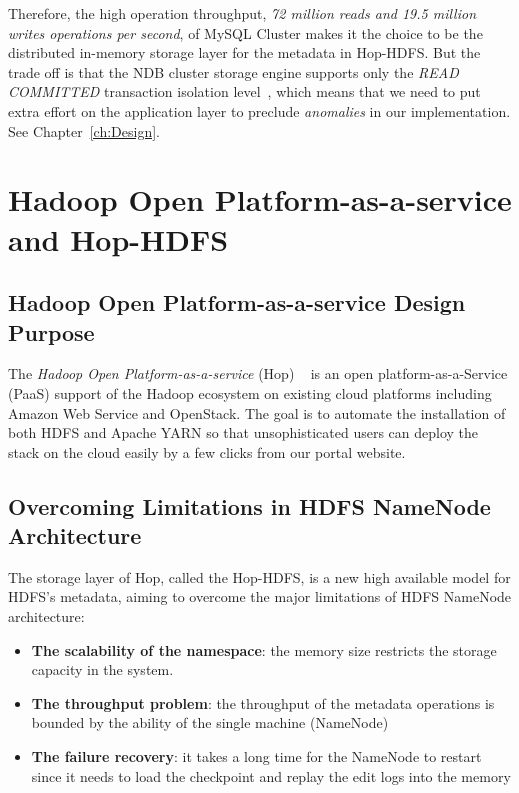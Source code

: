 \noindent Therefore, the high operation throughput, \textit{72 million reads and 19.5 million writes operations per second}, of MySQL Cluster makes it the choice to be the distributed in-memory storage layer for the metadata in Hop-HDFS. But the trade off is that the NDB cluster storage engine supports only the \textit{READ COMMITTED} transaction isolation level~\cite{mysqlreadcommited}, which means that we need to put extra effort on the application layer to preclude \textit{anomalies} in our implementation. See Chapter~\ref{ch:Design}.

\section{Hadoop Open Platform-as-a-service and Hop-HDFS}
\label{sc:Hop-HDFS}
\subsection{Hadoop Open Platform-as-a-service Design Purpose}
The \textit{Hadoop Open Platform-as-a-service} (Hop) ~\cite{hop} is an open platform-as-a-Service (PaaS) support of the Hadoop ecosystem on existing cloud platforms including Amazon Web Service and OpenStack. The goal is to automate the installation of both HDFS and Apache YARN so that unsophisticated users can deploy the stack on the cloud easily by a few clicks from our portal website. 

\subsection{Overcoming Limitations in HDFS NameNode Architecture}

\noindent The storage layer of Hop, called the Hop-HDFS, is a new high available model for HDFS's metadata, aiming to overcome the major limitations of HDFS NameNode architecture:

\begin{itemize}[noitemsep]
	\item \textbf{The scalability of the namespace}: the memory size restricts the storage capacity in the system.
	\item \textbf{The throughput problem}: the throughput of the metadata operations is bounded by the ability of the single machine (NameNode)
	\item \textbf{The failure recovery}: it takes a long time for the NameNode to restart since it needs to load the checkpoint and replay the edit logs into the memory
\end{itemize}

